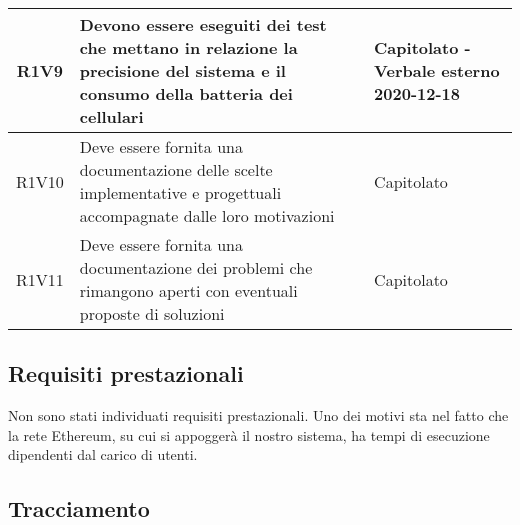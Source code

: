 \begin{center}
\begin{longtable}{|c|p{10cm}|p{4cm}|}
R1V9&Devono essere eseguiti dei test che mettano in relazione la precisione del sistema e il consumo della batteria dei cellulari	& Capitolato - Verbale esterno 2020-12-18	\\
		\hline
R1V10&Deve essere fornita una documentazione delle scelte implementative e progettuali accompagnate dalle loro motivazioni	& Capitolato	\\
		\hline
	R1V11	&Deve essere fornita una documentazione dei problemi che rimangono aperti con eventuali proposte di soluzioni	& Capitolato	\\
		\hline
	\end{longtable}
\end{center}

\subsection{Requisiti prestazionali}
Non sono stati individuati requisiti prestazionali. Uno dei motivi sta nel fatto che la rete Ethereum, su cui si appoggerà il nostro sistema, ha tempi di esecuzione dipendenti dal carico di utenti.
%		
%		

\subsection{Tracciamento}

